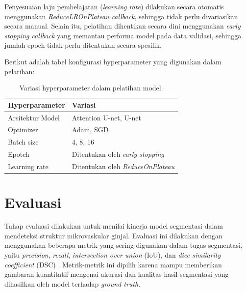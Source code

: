 Penyesuaian laju pembelajaran (\textit{learning rate}) dilakukan secara otomatis menggunakan \textit{ReduceLROnPlateau callback}, sehingga tidak perlu divariasikan secara manual. Selain itu, pelatihan dihentikan secara dini menggunakan \textit{early stopping callback} yang memantau performa model pada data validasi, sehingga jumlah epoch tidak perlu ditentukan secara spesifik.

Berikut adalah tabel konfigurasi hyperparameter yang digunakan dalam pelatihan:

\begin{table}[h]
	\centering
	\caption{Variasi hyperparameter dalam pelatihan model.}
	\label{tab:hyperparameter}
	\begin{tabular}{lllll}
		\hline
		\textbf{Hyperparameter} & \multicolumn{4}{l}{\textbf{Variasi}}                  \\ \hline
		Arsitektur Model        & \multicolumn{4}{l}{Attention U-net, U-net}            \\
		Optimizer               & \multicolumn{4}{l}{Adam, SGD}                         \\
		Batch size              & \multicolumn{4}{l}{4, 8, 16}                          \\
		Epotch                  & \multicolumn{4}{l}{Ditentukan oleh \textit{early stopping}}    \\
		Learning rate           & \multicolumn{4}{l}{Ditentukan oleh \textit{ReduceOnPlateau}} \\ \hline
	\end{tabular}
\end{table}


\section{Evaluasi}

\noindent Tahap evaluasi dilakukan untuk menilai kinerja model segmentasi dalam mendeteksi struktur mikrovaskular ginjal. Evaluasi ini dilakukan dengan menggunakan beberapa metrik yang sering digunakan dalam tugas segmentasi, yaitu \textit{precision}, \textit{recall}, \textit{intersection over union} (IoU), dan \textit{dice similarity coefficient} (DSC) \cite{jiang_iu-net_2023}. Metrik-metrik ini dipilih karena mampu memberikan gambaran kuantitatif mengenai akurasi dan kualitas hasil segmentasi yang dihasilkan oleh model terhadap \textit{ground truth}.

